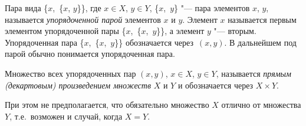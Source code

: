 \begin{defn}
Пара вида \{$x$,~\{$x$, $y$\}\}, где $x\in X$, $y\in Y$, \{$x$,~$y$\} "--- пара элементов $x$, $y$, называется \textit{упорядоченной парой} элементов $x$ и $y$. Элемент $x$ называется первым элементом упорядоченной пары \{$x$,~\{$x$,~$y$\}\}, а элемент $y$ "--- вторым. Упорядоченная пара \{$x$,~\{$x$,~$y$\}\} обозначается через~$(x,y)$. В дальнейшем под парой обычно понимается упорядоченная пара.
\end{defn}

\begin{defn}
Множество всех упорядоченных пар $(x,y)$, $x\in X$, $y \in Y$, называется \textit{прямым (декартовым) произведением множеств} $X$ и $Y$ и обозначается через $X\times Y$. 
\end{defn}
При этом не предполагается, что обязательно множество $X$ отлично от множества $Y$, т.е.~возможен и случай, когда $X = Y$.